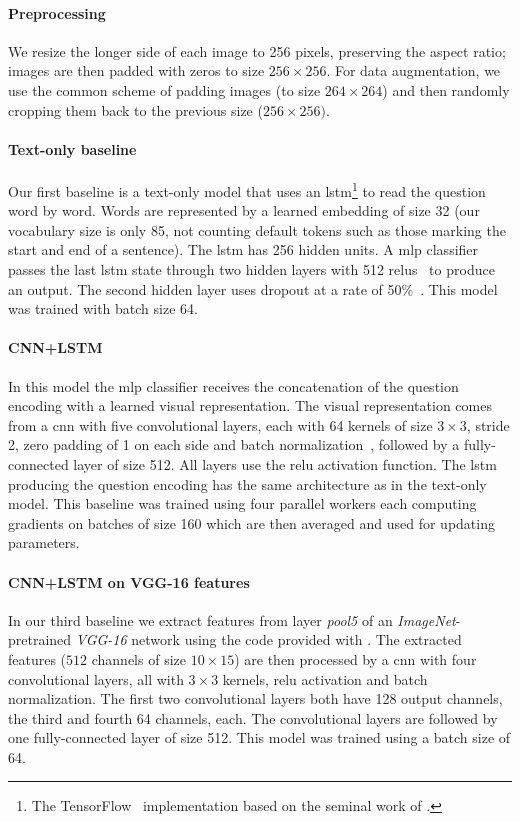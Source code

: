 \documentclass{article} \usepackage{iclr2018_workshop,times}
\begin{document}
\paragraph{Preprocessing} We resize the longer side of each image to 256 pixels, preserving the aspect ratio; images are then padded with zeros to size $256\times256$. For data augmentation, we use the common scheme of padding images (to size $264\times264$) and then randomly cropping them back to the previous size ($256\times256)$.

\paragraph{Text-only baseline}
Our first baseline is a text-only model that uses an \gls{lstm}\footnote{The TensorFlow~\citep{abadi2016tensorflow} implementation based on the seminal work of \citet{hochreiter1997long}.} to read the question word by word. Words are represented by a learned embedding of size 32 (our vocabulary size is only 85, not counting default tokens such as those marking the start and end of a sentence). The \gls{lstm} has 256 hidden units. 
A \gls{mlp} classifier passes the last \gls{lstm} state through two hidden layers with 512 \glspl{relu}~\citep{nair2010rectified} to produce an output. The second hidden layer uses dropout at a rate of 50\%~\citep{srivastava2014dropout}. This model was trained with batch size 64.

\paragraph{CNN+LSTM}
In this model the \gls{mlp} classifier receives the concatenation of the question encoding with a learned visual representation.
The visual representation comes from a \gls{cnn} with five convolutional layers, each with 64 kernels of size $3\times3$, stride 2, zero padding of 1 on each side and batch normalization~\citep{ioffe2015batch}, followed by a fully-connected layer of size 512. All layers use the \gls{relu} activation function.
The \gls{lstm} producing the question encoding has the same architecture as in the text-only model. This baseline was trained using four parallel workers each computing gradients on batches of size 160 which are then averaged and used for updating parameters.

\paragraph{CNN+LSTM on VGG-16 features}
In our third baseline we extract features from layer \emph{pool5} of an \emph{ImageNet}-pretrained \emph{VGG-16} network \citep{simonyan2014very} using the code provided with \citet{hu2017learning}. 
The extracted features ($512$ channels of size $10\times15$) are then processed by a \gls{cnn} with four convolutional layers, all with $3\times3$ kernels, \gls{relu} activation and batch normalization. The first two convolutional layers both have 128 output channels, the third and fourth 64 channels, each.
The convolutional layers are followed by one fully-connected layer of size 512. This model was trained using a batch size of 64.
\end{document}
